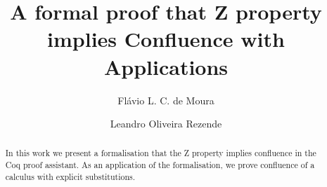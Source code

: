 \documentclass[sigplan,10pt,review]{acmart}\settopmatter{printfolios=true,printccs=false,printacmref=false}
\begin{document}
\title[Z property implies Confluence]{A formal proof that Z property implies Confluence with Applications}
\author{Flávio L. C. de Moura}

\author{Leandro Oliveira Rezende}

\begin{abstract}
  
  In this work we present a formalisation that the Z property implies
  confluence in the Coq proof assistant. As an application of the
  formalisation, we prove confluence of a calculus with explicit
  substitutions.
  
\end{abstract}

\maketitle




\end{document}
